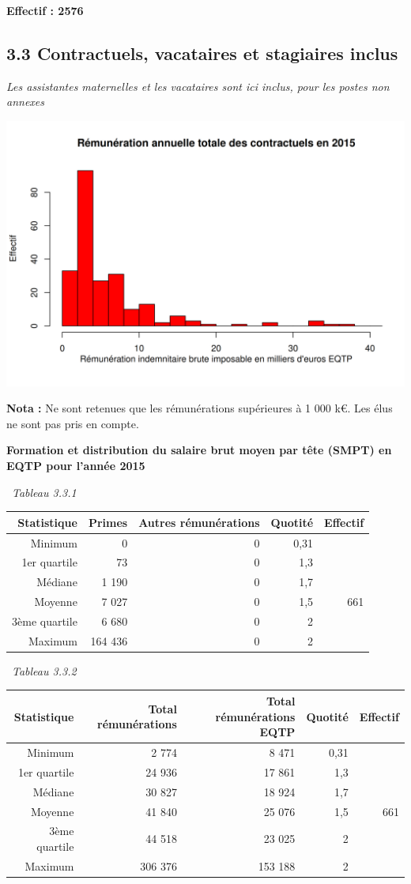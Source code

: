 \textbf{Effectif : 2576 }

\hypertarget{contractuels-vacataires-et-stagiaires-inclus-1}{%
\subsection{3.3 Contractuels, vacataires et stagiaires
inclus}\label{contractuels-vacataires-et-stagiaires-inclus-1}}

\emph{Les assistantes maternelles et les vacataires sont ici inclus,
pour les postes non annexes}

\includegraphics{altair_files/figure-latex/unnamed-chunk-94-1.png}

\textbf{Nota :} Ne sont retenues que les rémunérations supérieures à 1
000 k€. Les élus ne sont pas pris en compte.

\textbf{Formation et distribution du salaire brut moyen par tête (SMPT)
en EQTP pour l'année 2015 }

~\emph{Tableau 3.3.1}

\begin{longtable}[]{@{}rrrrr@{}}
\toprule
Statistique & Primes & Autres rémunérations & Quotité &
Effectif\tabularnewline
\midrule
\endhead
Minimum & 0 & 0 & 0,31 &\tabularnewline
1er quartile & 73 & 0 & 1,3 &\tabularnewline
Médiane & 1 190 & 0 & 1,7 &\tabularnewline
Moyenne & 7 027 & 0 & 1,5 & 661\tabularnewline
3ème quartile & 6 680 & 0 & 2 &\tabularnewline
Maximum & 164 436 & 0 & 2 &\tabularnewline
\bottomrule
\end{longtable}

~\emph{Tableau 3.3.2}

\begin{longtable}[]{@{}rrrrr@{}}
\toprule
Statistique & Total rémunérations & Total rémunérations EQTP & Quotité &
Effectif\tabularnewline
\midrule
\endhead
Minimum & 2 774 & 8 471 & 0,31 &\tabularnewline
1er quartile & 24 936 & 17 861 & 1,3 &\tabularnewline
Médiane & 30 827 & 18 924 & 1,7 &\tabularnewline
Moyenne & 41 840 & 25 076 & 1,5 & 661\tabularnewline
3ème quartile & 44 518 & 23 025 & 2 &\tabularnewline
Maximum & 306 376 & 153 188 & 2 &\tabularnewline
\bottomrule
\end{longtable}

